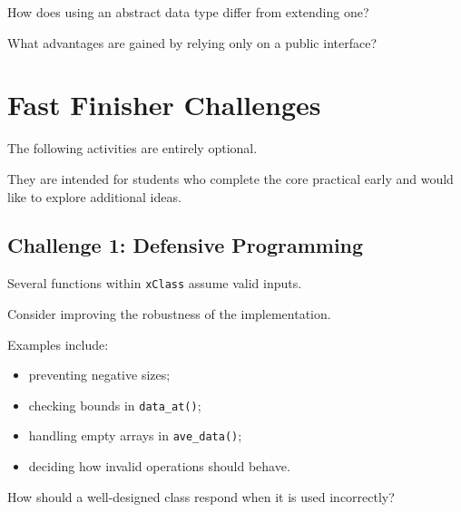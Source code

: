 \documentclass{csc2059practical}
\begin{document}
\begin{reflectionbox}

How does using an abstract data type differ from extending one?

What advantages are gained by relying only on a public interface?

\end{reflectionbox}

\section{Fast Finisher Challenges}

\begin{challengebox}

The following activities are entirely optional.

They are intended for students who complete the core practical early
and would like to explore additional ideas.


\end{challengebox}

\subsection*{Challenge 1: Defensive Programming}

Several functions within \texttt{xClass} assume valid inputs.

Consider improving the robustness of the implementation.

Examples include:

\begin{itemize}
    
    \item preventing negative sizes;
    
    \item checking bounds in \texttt{data\_at()};
    
    \item handling empty arrays in \texttt{ave\_data()};
    
    \item deciding how invalid operations should behave.
    
\end{itemize}

How should a well-designed class respond when it is used incorrectly?
\end{document}
